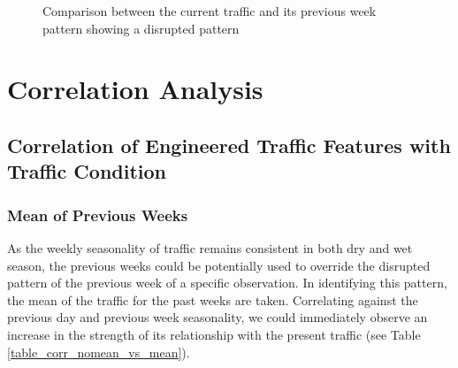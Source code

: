 \begin{figure}[!t] 
\centering
  \caption{Comparison between the current traffic and its previous week pattern showing a disrupted pattern}
  \label{figure_traffic_disrupted}
\end{figure}









\section{Correlation Analysis}
\subsection{Correlation of Engineered Traffic Features with Traffic Condition}

\subsubsection{Mean of Previous Weeks}
As the weekly seasonality of traffic remains consistent in both dry and wet season, the previous weeks could be potentially used to override the disrupted pattern of the previous week of a specific observation. In identifying this pattern, the mean of the traffic for the past weeks are taken. Correlating against the previous day and previous week seasonality, we could immediately observe an increase in the strength of its relationship with the present traffic (see Table \ref{table_corr_nomean_vs_mean}).


